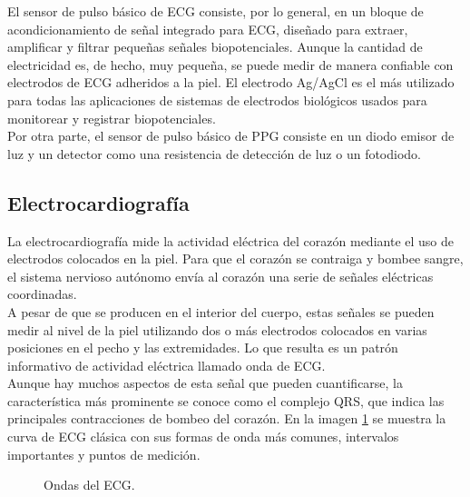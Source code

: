 	El sensor de pulso básico de ECG consiste, por lo general, en un bloque de acondicionamiento de señal integrado para ECG, diseñado para extraer, amplificar y filtrar pequeñas señales biopotenciales. Aunque la cantidad de electricidad es, de hecho, muy pequeña, se puede medir de manera confiable con electrodos de ECG adheridos a la piel. El electrodo Ag/AgCl es el más utilizado para todas las aplicaciones de sistemas de electrodos biológicos usados para monitorear y registrar biopotenciales. \cite{naylampECG} \cite{imotionsECG} \cite{salvatore2011} \\
	
	Por otra parte, el sensor de pulso básico de PPG consiste en un diodo emisor de luz y un detector como una resistencia de detección de luz o un fotodiodo. \cite{agarwalHS}

	\subsection{Electrocardiografía}
		La electrocardiografía mide la actividad eléctrica del corazón mediante el uso de electrodos colocados en la piel. Para que el corazón se contraiga y bombee sangre, el sistema nervioso autónomo envía al corazón una serie de señales eléctricas coordinadas. \\
		
		A pesar de que se producen en el interior del cuerpo, estas señales se pueden medir al nivel de la piel utilizando dos o más electrodos colocados en varias posiciones en el pecho y las extremidades. Lo que resulta es un patrón informativo de actividad eléctrica llamado onda de ECG. \\
		
		Aunque hay muchos aspectos de esta señal que pueden cuantificarse, la característica más prominente se conoce como el complejo QRS, que indica las principales contracciones de bombeo del corazón. En la imagen \ref{fig:ECGwave} se muestra la curva de ECG clásica con sus formas de onda más comunes, intervalos importantes y puntos de medición. \\
		
		\begin{figure}[htbp!]
			\centering
			\caption{Ondas del ECG.}
			\label{fig:ECGwave}
		\end{figure}
		
